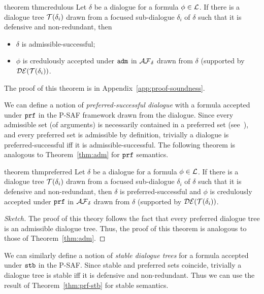 \begin{restatable}{theorem} {thmcredulous} \label{thm:adm}
 Let $\delta$ be a dialogue for a formula $\phi \in \mathcal{L}$. If there is a dialogue tree $\mathcal{T}(\delta_i)$ drawn from a focused sub-dialogue $\delta_i$ of $\delta$ such that it is defensive and non-redundant, then 
  \begin{itemize}
      \item $\delta$ is admissible-successful; 
      \item $\phi$ is credulously accepted under $\texttt{\textup{adm}}$ in $\mathcal{AF}_ \delta$ drawn from $\delta$ (supported by $\mathcal{DE}(\mathcal{T}(\delta_i))$.
\end{itemize}
\end{restatable}

The proof of this theorem is in Appendix~\ref{app:proof-soundness}.

We can define a notion of \emph{preferred-successful dialogue} with a formula accepted under $\texttt{\textup{prf}}$ in the P-SAF framework drawn from the dialogue. Since every admissible set (of arguments) is necessarily contained in a preferred set (see~\cite{Dung95,Nielsen2007}), and every preferred set is admissible by definition, trivially a dialogue is preferred-successful iff it is admissible-successful. The following theorem is analogous to Theorem~\ref{thm:adm} for $\texttt{\textup{prf}}$ semantics.

\begin{restatable} {theorem} {thmpreferred} 
\label{thm:prf-stb}
Let $\delta$ be a dialogue for a formula $\phi \in \mathcal{L}$. If there is a dialogue tree $\mathcal{T}(\delta_i)$ drawn from a focused sub-dialogue $\delta_i$ of $\delta$ such that it is defensive and non-redundant, then $\delta$ is preferred-successful and $\phi$ is credulously accepted under $\texttt{\textup{prf}}$ in $\mathcal{AF}_ \delta$ drawn from $\delta$ (supported by $\mathcal{DE}(\mathcal{T}(\delta_i))$.    
\end{restatable}

\begin{proof} [Sketch]
The proof of this theory follows the fact that every preferred dialogue tree is an admissible dialogue tree. Thus, the proof of this theorem is analogous to those of Theorem~\ref{thm:adm}.
\end{proof}


\begin{remark}
    We can similarly define a notion of \emph{stable dialogue trees} for a formula accepted under $\texttt{\textup{stb}}$ in the P-SAF. Since stable and preferred sets coincide, trivially a dialogue tree is stable iff it is defensive and non-redundant. Thus we can use the result of Theorem~\ref{thm:prf-stb} for stable semantics.
\end{remark}
    


